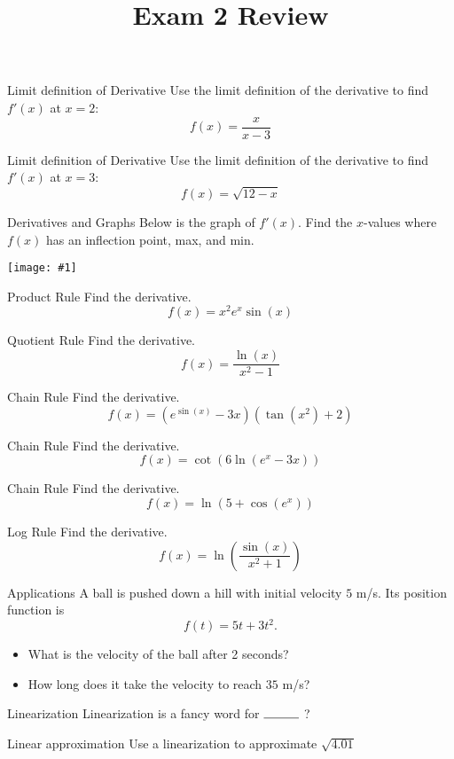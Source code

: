 \documentclass[t]{beamer}
\title{Exam 2 Review}
\date{}
\newcommand{\img}[1]{
\vfill
\texttt{[image: \#1]}
\vfill
}
\begin{document}
\frame{\titlepage}

\begin{frame}{Limit definition of Derivative}
Use the limit definition of the derivative to find $f'(x)$ at $x = 2$:
$$f(x) = \frac{x}{x-3}$$
\end{frame}

\begin{frame}{Limit definition of Derivative}
Use the limit definition of the derivative to find $f'(x)$ at $x = 3$:
$$f(x) = \sqrt{12 - x}$$
\end{frame}

\begin{frame}{Derivatives and Graphs}
Below is the graph of $f'(x)$.  Find the $x$-values where $f(x)$ has
an inflection point, max, and min.
\img{dg2}
\end{frame}

\begin{frame}{Product Rule}
Find the derivative.
$$f(x) = x^2 e^x \sin(x)$$
\end{frame}

\begin{frame}{Quotient Rule}
Find the derivative.
$$f(x) = \frac{\ln(x)}{x^2 - 1}$$
\end{frame}

\begin{frame}{Chain Rule}
Find the derivative.
$$f(x) = \left( e^{\sin(x)} -3x \right) \left( \tan(x^2) + 2 \right)$$
\end{frame}

\begin{frame}{Chain Rule}
Find the derivative.
$$f(x) = \cot(6 \ln( e^x - 3x))$$
\end{frame}

\begin{frame}{Chain Rule}
Find the derivative.
$$f(x) = \ln(5 + \cos(e^x))$$
\end{frame}

\begin{frame}{Log Rule}
Find the derivative.
$$f(x) = \ln \left( \frac{\sin(x)}{x^2 + 1} \right)$$
\end{frame}

\begin{frame}{Applications}
A ball is pushed down a hill with initial velocity $5$ m/s.  Its position
function is
$$f(t) = 5t + 3t^2.$$
\begin{itemize}
\item What is the velocity of the ball after 2 seconds?
\item How long does it take the velocity to reach $35$ m/s?
\end{itemize}
\end{frame}

\begin{frame}{Linearization}
Linearization is a fancy word for $\rule{1cm}{0.15mm}$ ?
\end{frame}

\begin{frame}{Linear approximation}
Use a linearization to approximate $\sqrt{4.01}$
\end{frame}
\end{document}

